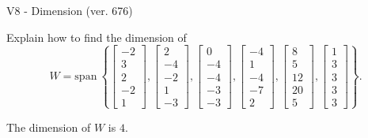\begin{exercise}
  \begin{exerciseTitle}V8 - Dimension (ver. 676)\end{exerciseTitle}
  \begin{exerciseStatement}
    Explain how to find the dimension of 
\[W=\mathrm{span}\ \left\{\left[\begin{array}{r}
-2 \\
3 \\
2 \\
-2 \\
1
\end{array}\right] , \left[\begin{array}{r}
2 \\
-4 \\
-2 \\
1 \\
-3
\end{array}\right] , \left[\begin{array}{r}
0 \\
-4 \\
-4 \\
-3 \\
-3
\end{array}\right] , \left[\begin{array}{r}
-4 \\
1 \\
-4 \\
-7 \\
2
\end{array}\right] , \left[\begin{array}{r}
8 \\
5 \\
12 \\
20 \\
5
\end{array}\right] , \left[\begin{array}{r}
1 \\
3 \\
3 \\
3 \\
3
\end{array}\right]\right\}.\]



  \end{exerciseStatement}
  \begin{exerciseAnswer}
   The dimension of \(W\) is  \(4\).
  


  \end{exerciseAnswer}
\end{exercise}